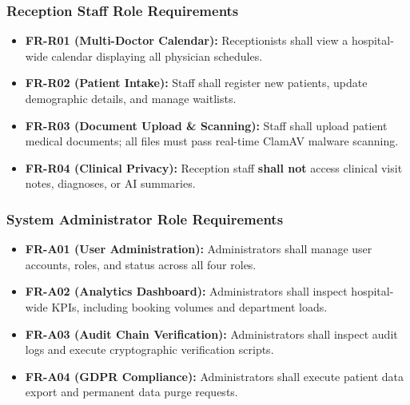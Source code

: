 \documentclass[conference]{IEEEtran}
\begin{document}
\subsubsection{Reception Staff Role Requirements}
\begin{itemize}
    \item \textbf{FR-R01 (Multi-Doctor Calendar):} Receptionists shall view a hospital-wide calendar displaying all physician schedules.
    \item \textbf{FR-R02 (Patient Intake):} Staff shall register new patients, update demographic details, and manage waitlists.
    \item \textbf{FR-R03 (Document Upload \& Scanning):} Staff shall upload patient medical documents; all files must pass real-time ClamAV malware scanning.
    \item \textbf{FR-R04 (Clinical Privacy):} Reception staff \textbf{shall not} access clinical visit notes, diagnoses, or AI summaries.
\end{itemize}

\subsubsection{System Administrator Role Requirements}
\begin{itemize}
    \item \textbf{FR-A01 (User Administration):} Administrators shall manage user accounts, roles, and status across all four roles.
    \item \textbf{FR-A02 (Analytics Dashboard):} Administrators shall inspect hospital-wide KPIs, including booking volumes and department loads.
    \item \textbf{FR-A03 (Audit Chain Verification):} Administrators shall inspect audit logs and execute cryptographic verification scripts.
    \item \textbf{FR-A04 (GDPR Compliance):} Administrators shall execute patient data export and permanent data purge requests.
\end{itemize}
\end{document}
